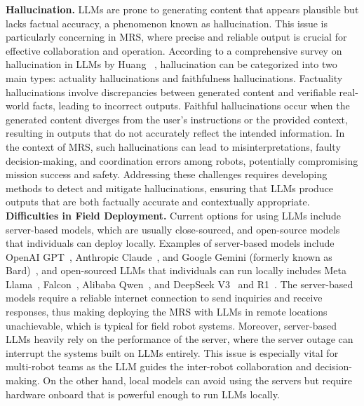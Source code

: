 \noindent\textbf{Hallucination.}
LLMs are prone to generating content that appears plausible but lacks factual accuracy, a phenomenon known as hallucination. This issue is particularly concerning in MRS, where precise and reliable output is crucial for effective collaboration and operation. According to a comprehensive survey on hallucination in LLMs by Huang \etal~\cite{huang2023survey}, hallucination can be categorized into two main types: actuality hallucinations and faithfulness hallucinations. Factuality hallucinations involve discrepancies between generated content and verifiable real-world facts, leading to incorrect outputs. Faithful hallucinations occur when the generated content diverges from the user's instructions or the provided context, resulting in outputs that do not accurately reflect the intended information. In the context of MRS, such hallucinations can lead to misinterpretations, faulty decision-making, and coordination errors among robots, potentially compromising mission success and safety. Addressing these challenges requires developing methods to detect and mitigate hallucinations, ensuring that LLMs produce outputs that are both factually accurate and contextually appropriate.\\

\noindent\textbf{Difficulties in Field Deployment.}
Current options for using LLMs include server-based models, which are usually close-sourced, and open-source models that individuals can deploy locally. Examples of server-based models include OpenAI GPT~\cite{achiam2023gpt}, Anthropic Claude~\cite{claude}, and Google Gemini (formerly known as Bard)~\cite{googleGemini}, and open-sourced LLMs that individuals can run locally includes Meta Llama~\cite{dubey2024llama}, Falcon~\cite{almazrouei2023falcon},  Alibaba Qwen~\cite{qwen2.5}, and DeepSeek V3~\cite{liu2024deepseek} and R1~\cite{guo2025deepseek}. The server-based models require a reliable internet connection to send inquiries and receive responses, thus making deploying the MRS with LLMs in remote locations unachievable, which is typical for field robot systems. Moreover, server-based LLMs heavily rely on the performance of the server, where the server outage can interrupt the systems built on LLMs entirely. This issue is especially vital for multi-robot teams as the LLM guides the inter-robot collaboration and decision-making. On the other hand, local models can avoid using the servers but require hardware onboard that is powerful enough to run LLMs locally. \\

